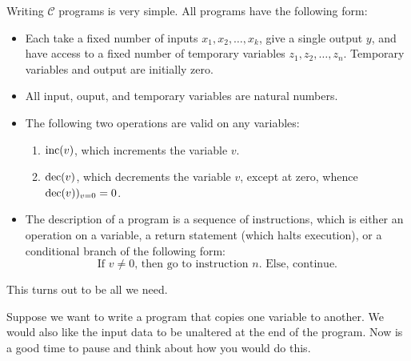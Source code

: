 \documentclass[english, 12pt]{article}
\begin{document}
  Writing $\mathcal{C}$ programs is very simple. All programs have the 
  following form: 
  \begin{itemize}
      \item Each take a fixed number of inputs $x_1, x_2, \dots, x_k$,
            give a single output $y$, and have access to a fixed number
            of temporary variables $z_1, z_2, \dots, z_n$. Temporary variables
            and output are initially zero.
      \item All input, ouput, and temporary variables are natural numbers.
      \item The following two operations are valid on any variables:
          \begin{enumerate}
              \item $\text{inc}(v)$, which increments the variable $v$.
              \item $\text{dec}(v)$, which decrements the variable $v$, except at zero, 
                whence $\text{dec}(v))_{v=0} = 0$.
          \end{enumerate}
      \item The description of a program is a sequence of instructions,
            which is either an operation on a variable, a return statement (which
            halts execution), or a conditional branch of the following form:
            \[ \text{If } v \neq 0 \text{, then go to instruction } n
            \text{. Else, continue.} \]
  \end{itemize}
  This turns out to be all we need.  \n
  
  Suppose we want to write a program that copies one variable to another. We would also like the
  input data to be unaltered at the end of the program. Now is a good time to pause and think about
  how you would do this. \n
  
\end{document}
